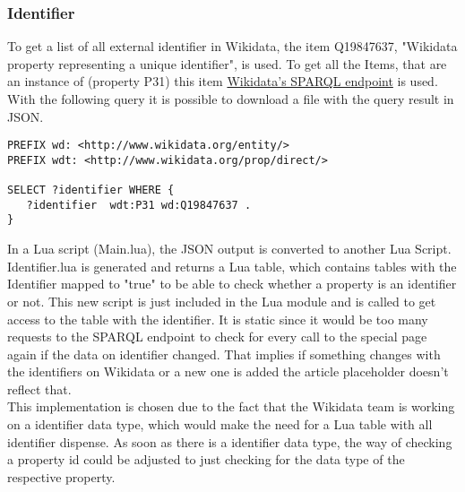 \subsubsection{Identifier}

To get a list of all external identifier in Wikidata, the item Q19847637, "Wikidata property representing a unique identifier", is used. To get all the Items, that are an instance of (property P31) this item \href{https://query.wikidata.org}{Wikidata's SPARQL endpoint} is used. With the following query it is possible to download a file with the query result in JSON. \\

\begin{lstlisting}[frame=single] 
PREFIX wd: <http://www.wikidata.org/entity/>
PREFIX wdt: <http://www.wikidata.org/prop/direct/>

SELECT ?identifier WHERE {
   ?identifier  wdt:P31 wd:Q19847637 . 
}
\end{lstlisting}

In a Lua script (Main.lua), the JSON output is converted to another Lua Script. Identifier.lua is generated and returns a Lua table, which contains tables with the Identifier mapped to "true" to be able to check whether a property is an identifier or not. This new script is just included in the Lua module and is called to get access to the table with the identifier. It is static since it would be too many requests to the SPARQL endpoint to check for every call to the special page again if the data on identifier changed. That implies if something changes with the identifiers on Wikidata or a new one is added the article placeholder doesn't reflect that. \\
This implementation is chosen due to the fact that the Wikidata team is working on a identifier data type, which would make the need for a Lua table with all identifier dispense. As soon as there is a identifier data type, the way of checking a property id could be adjusted to just checking for the data type of the respective property. 
